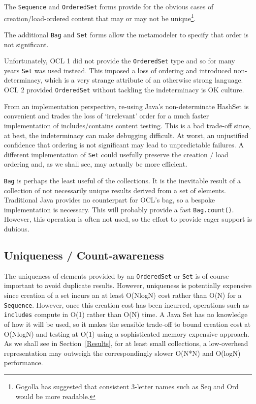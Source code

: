 \documentclass[
]{ceurart}
\begin{document}
The \verb!Sequence! and \verb!OrderedSet! forms provide for the obvious cases of creation/load-ordered content that may or may not be unique\footnote{Gogolla \cite{gogolla2019keynote} has suggested that consistent 3-letter names such as Seq and Ord would be more readable.}.

The additional \verb!Bag! and \verb!Set! forms allow the metamodeler to specify that order is not significant.

Unfortunately, OCL 1 did not provide the \verb!OrderedSet! type and so for many years \verb!Set! was used instead. This imposed a loss of ordering and introduced non-determinacy, which is a very strange attribute of an otherwise strong language. OCL 2 provided \verb!OrderedSet! without tackling the indeterminacy is OK culture.

From an implementation perspective, re-using Java's non-determinate HashSet is convenient and trades the loss of `irrelevant' order for a much faster implementation of includes/contains content testing. This is a bad trade-off since, at best, the indeterminacy can make debugging difficult. At worst, an unjustified confidence that ordering is not significant may lead to unpredictable failures. A different implementation of \verb!Set! could usefully preserve the creation / load ordering and, as we shall see, may actually be more efficient.

\verb!Bag! is perhaps the least useful of the collections. It is the inevitable result of a collection of not necessarily unique results derived from a set of elements. Traditional Java provides no counterpart for OCL's bag, so a bespoke implementation is necessary. This will probably provide a fast \verb!Bag.count()!. However, this operation is often not used, so the effort to provide eager support is dubious.

\subsection{Uniqueness / Count-awareness}

The uniqueness of elements provided by an \verb!OrderedSet! or \verb!Set! is of course important to avoid duplicate results. However, uniqueness is potentially expensive since creation of a set incurs an at least O(NlogN) cost rather than O(N) for a \verb!Sequence!. However, once this creation cost has been incurred, operations such as \verb!includes! compute in O(1) rather than O(N) time. A Java Set has no knowledge of how it will be used, so it makes the sensible trade-off to bound creation cost at O(NlogN) and testing at O(1) using a sophisticated memory expensive approach. As we shall see in Section~\ref{Results}, for at least small collections, a low-overhead representation may outweigh the correspondingly slower O(N*N) and O(logN) performance. 
\end{document}

